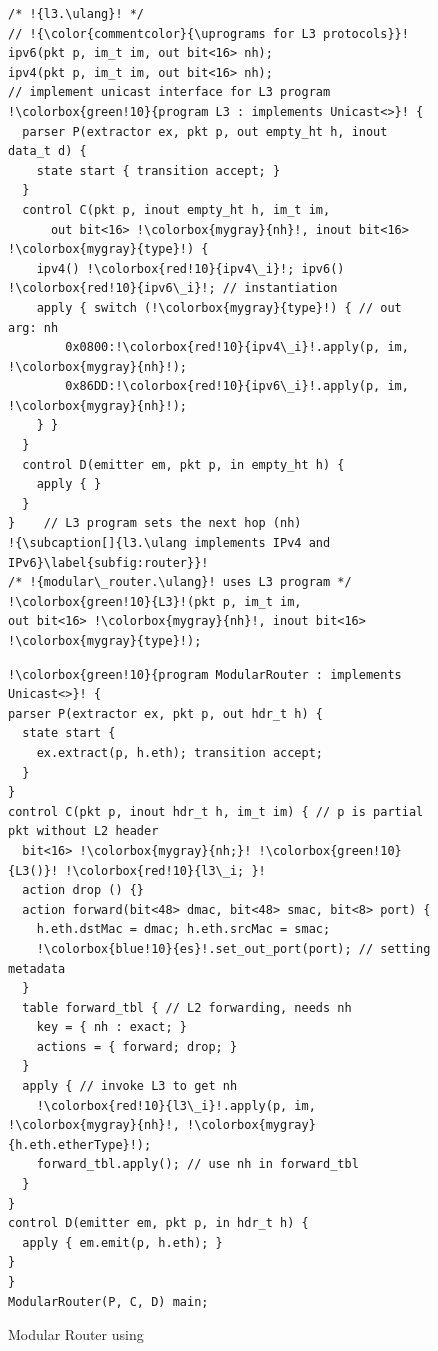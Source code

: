 \documentclass[letterpaper,twocolumn,10pt]{article}
\begin{document}
\begin{figure}[!ht]
\noindent \begin{minipage}[t]{.50\textwidth}
\begin{lstlisting}[frame=none, escapechar=!]
/* !{l3.\ulang}! */
// !{\color{commentcolor}{\uprograms for L3 protocols}}! 
ipv6(pkt p, im_t im, out bit<16> nh);
ipv4(pkt p, im_t im, out bit<16> nh);
// implement unicast interface for L3 program
!\colorbox{green!10}{program L3 : implements Unicast<>}! {
  parser P(extractor ex, pkt p, out empty_ht h, inout data_t d) {
    state start { transition accept; }
  }
  control C(pkt p, inout empty_ht h, im_t im,
      out bit<16> !\colorbox{mygray}{nh}!, inout bit<16> !\colorbox{mygray}{type}!) {
    ipv4() !\colorbox{red!10}{ipv4\_i}!; ipv6() !\colorbox{red!10}{ipv6\_i}!; // instantiation
    apply { switch (!\colorbox{mygray}{type}!) { // out arg: nh
        0x0800:!\colorbox{red!10}{ipv4\_i}!.apply(p, im, !\colorbox{mygray}{nh}!);
        0x86DD:!\colorbox{red!10}{ipv6\_i}!.apply(p, im, !\colorbox{mygray}{nh}!);
    } }
  }
  control D(emitter em, pkt p, in empty_ht h) {
    apply { }
  }
}    // L3 program sets the next hop (nh)
!{\subcaption[]{l3.\ulang implements IPv4 and IPv6}\label{subfig:router}}!
/* !{modular\_router.\ulang}! uses L3 program */
!\colorbox{green!10}{L3}!(pkt p, im_t im, 
out bit<16> !\colorbox{mygray}{nh}!, inout bit<16> !\colorbox{mygray}{type}!);
\end{lstlisting}
\end{minipage}\hspace{-4pt}\vline
\hfill\begin{minipage}[t]{.50\textwidth}
\begin{lstlisting}[frame=none, escapechar=!]
!\colorbox{green!10}{program ModularRouter : implements Unicast<>}! {
parser P(extractor ex, pkt p, out hdr_t h) {
  state start {
    ex.extract(p, h.eth); transition accept;
  }
}
control C(pkt p, inout hdr_t h, im_t im) { // p is partial pkt without L2 header
  bit<16> !\colorbox{mygray}{nh;}! !\colorbox{green!10}{L3()}! !\colorbox{red!10}{l3\_i; }!
  action drop () {}
  action forward(bit<48> dmac, bit<48> smac, bit<8> port) {
    h.eth.dstMac = dmac; h.eth.srcMac = smac;
    !\colorbox{blue!10}{es}!.set_out_port(port); // setting metadata
  }
  table forward_tbl { // L2 forwarding, needs nh
    key = { nh : exact; } 
    actions = { forward; drop; }
  }
  apply { // invoke L3 to get nh
    !\colorbox{red!10}{l3\_i}!.apply(p, im, !\colorbox{mygray}{nh}!, !\colorbox{mygray}{h.eth.etherType}!);
    forward_tbl.apply(); // use nh in forward_tbl
  }
}
control D(emitter em, pkt p, in hdr_t h) {
  apply { em.emit(p, h.eth); }
}
}
ModularRouter(P, C, D) main;
\end{lstlisting}
\label{subfig:router-main}
\end{minipage}
\caption[]{Modular Router using \uarch \footnotemark}
\label{fig:modular-router}
\end{figure}
\end{document}
